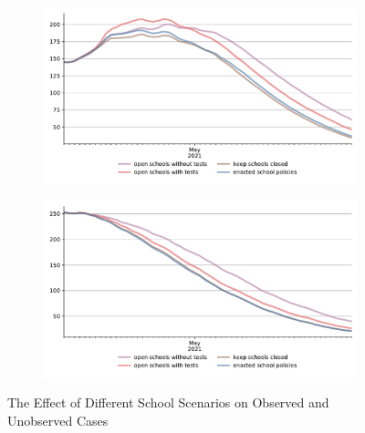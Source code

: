 \begin{figure}[ht]
  \centering
  \begin{subfigure}{.6\textwidth}
    \includegraphics[width=0.9 \textwidth]{../figures/results/figures/scenario_comparisons/school_scenarios/full_new_known_case}
  \end{subfigure}%
  \begin{subfigure}{.6\textwidth}
    \includegraphics[width=0.9 \textwidth]{../figures/results/figures/scenario_comparisons/school_scenarios/full_newly_infected}
  \end{subfigure}
  \caption{The Effect of Different School Scenarios on Observed and Unobserved Cases}
  \label{fig:school_scenarios}
\end{figure}


\FloatBarrier



\FloatBarrier
